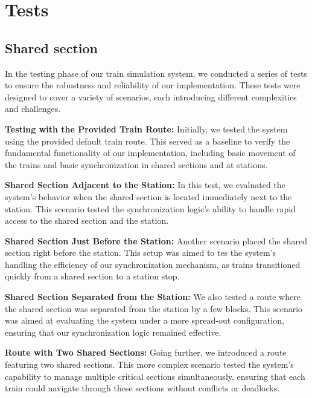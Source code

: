 \documentclass{article}
\begin{document}
    

    \begin{lstlisting}
    \end{lstlisting}


    \section{Tests}

    \subsection*{Shared section}
    In the testing phase of our train simulation system, we conducted a series of tests to ensure the robustness and reliability of our implementation. These tests were designed to cover a variety of scenarios, each introducing different complexities and challenges.

    \textbf{Testing with the Provided Train Route:} Initially, we tested the system using the provided default train route. This served as a baseline to verify the fundamental functionality of our implementation, including basic movement of the trains and basic synchronization in shared sections and at stations.

    \textbf{Shared Section Adjacent to the Station:} In this test, we evaluated the system's behavior when the shared section is located immediately next to the station. This scenario tested the synchronization logic's ability to handle rapid access to the shared section and the station.

    \textbf{Shared Section Just Before the Station:} Another scenario placed the shared section right before the station. This setup was aimed to tes the system's handling the efficiency of our synchronization mechanism, as trains transitioned quickly from a shared section to a station stop.

    \textbf{Shared Section Separated from the Station:} We also tested a route where the shared section was separated from the station by a few blocks. This scenario was aimed at evaluating the system under a more spread-out configuration, ensuring that our synchronization logic remained effective.

    \textbf{Route with Two Shared Sections:} Going further, we introduced a route featuring two shared sections. This more complex scenario tested the system's capability to manage multiple critical sections simultaneously, ensuring that each train could navigate through these sections without conflicts or deadlocks.
\end{document}
